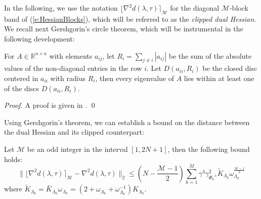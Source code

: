 In the following, we use the notation $\lfloor \nabla^2 d(\lambda, \tau) \rceil_{\mathcal{M}}$ for the diagonal $\mathcal{M}$-block band of (\ref{e:HessianBlocks}), which will be referred to as the \emph{clipped dual Hessian}. We recall next Gershgorin's circle theorem, which will be instrumental in the following development:
\begin{theorem} \label{l:Gerschgorin}
For $A \in \mathbb{R}^{n \times n}$ with elements $a_{ij}$, let $R_i = \sum_{j \neq i} | a_{ij} |$ be the sum of the absolute values of the non-diagonal entries in the row $i$. Let $D(a_{ii},R_i)$ be the closed disc centered in $a_{ii}$ with radius $R_i$, then every eigenvalue of $A$ lies within at least one of the discs $D(a_{ii}, R_i)$.
\end{theorem}
\begin{proof}
A proof is given in \cite{HornR2013}.
\qed
\end{proof}
Using Gershgorin's theorem, we can establish a bound on the distance between the dual Hessian and its clipped counterpart:
\begin{lemma} \label{l:EuclidianDistance}
Let $\mathcal{M}$ be an odd integer in the interval $[1,2N+1]$, then the following bound holds:
\begin{equation} \label{e:EuclidianDistance}
\| \lfloor \nabla^2 d(\lambda, \tau) \rceil_{\mathcal{M}} - \nabla^2 d(\lambda, \tau) \|_2 \leq \left( N -\frac{\mathcal{M} - 1}{2} \right) \sum_{k=1}^M \gamma^4 \gamma_{\Phi_k^{-1}}^2 \tilde{K}_{\Lambda_k} \omega_{\Lambda_k}^{\frac{\mathcal{M} - 1}{2}}
\end{equation}
where $\tilde{K}_{\Lambda_k} = \bar{K}_{\Lambda_k} \omega_{\Lambda_k} =  (2 + \omega_{\Lambda_k} + \omega_{\Lambda_k}^{-1}) K_{\Lambda_k}$.
\end{lemma}
